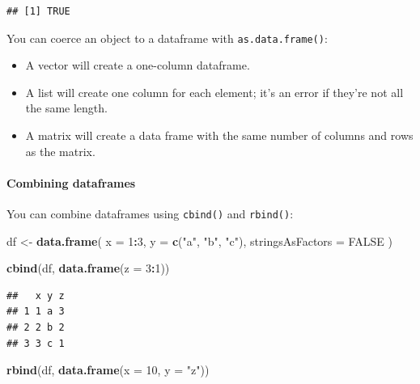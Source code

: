 \documentclass[
]{book}
\newenvironment{Shaded}{\begin{snugshade}}{\end{snugshade}}
\newcommand{\AttributeTok}[1]{\textcolor[rgb]{0.13,0.29,0.53}{#1}}
\newcommand{\ConstantTok}[1]{\textcolor[rgb]{0.56,0.35,0.01}{#1}}
\newcommand{\DecValTok}[1]{\textcolor[rgb]{0.00,0.00,0.81}{#1}}
\newcommand{\FunctionTok}[1]{\textcolor[rgb]{0.13,0.29,0.53}{\textbf{#1}}}
\newcommand{\NormalTok}[1]{#1}
\newcommand{\OtherTok}[1]{\textcolor[rgb]{0.56,0.35,0.01}{#1}}
\newcommand{\SpecialCharTok}[1]{\textcolor[rgb]{0.81,0.36,0.00}{\textbf{#1}}}
\newcommand{\StringTok}[1]{\textcolor[rgb]{0.31,0.60,0.02}{#1}}
\begin{document}
\begin{verbatim}
## [1] TRUE
\end{verbatim}

You can coerce an object to a dataframe with \texttt{as.data.frame()}:

\begin{itemize}
\item
  A vector will create a one-column dataframe.
\item
  A list will create one column for each element; it's an error if they're
  not all the same length.
\item
  A matrix will create a data frame with the same number of columns and rows as the matrix.
\end{itemize}

\paragraph{Combining dataframes}\label{combining-dataframes}

You can combine dataframes using \texttt{cbind()} and \texttt{rbind()}:

\begin{Shaded}
\begin{Highlighting}[]
\NormalTok{df }\OtherTok{\textless{}{-}} \FunctionTok{data.frame}\NormalTok{(}
  \AttributeTok{x =} \DecValTok{1}\SpecialCharTok{:}\DecValTok{3}\NormalTok{,}
  \AttributeTok{y =} \FunctionTok{c}\NormalTok{(}\StringTok{"a"}\NormalTok{, }\StringTok{"b"}\NormalTok{, }\StringTok{"c"}\NormalTok{),}
  \AttributeTok{stringsAsFactors =} \ConstantTok{FALSE}
\NormalTok{)}

\FunctionTok{cbind}\NormalTok{(df, }\FunctionTok{data.frame}\NormalTok{(}\AttributeTok{z =} \DecValTok{3}\SpecialCharTok{:}\DecValTok{1}\NormalTok{))}
\end{Highlighting}
\end{Shaded}

\begin{verbatim}
##   x y z
## 1 1 a 3
## 2 2 b 2
## 3 3 c 1
\end{verbatim}

\begin{Shaded}
\begin{Highlighting}[]
\FunctionTok{rbind}\NormalTok{(df, }\FunctionTok{data.frame}\NormalTok{(}\AttributeTok{x =} \DecValTok{10}\NormalTok{, }\AttributeTok{y =} \StringTok{"z"}\NormalTok{))}
\end{Highlighting}
\end{Shaded}
\end{document}
